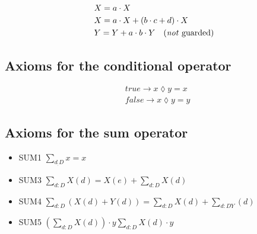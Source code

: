 \begin{align*}
  & X = a \cdot X \\
  & X = a \cdot X + (b \cdot c + d) \cdot X \\
  & Y = Y + a \cdot b \cdot Y \quad (\text{\emph{not} guarded})
\end{align*}

\subsection{Axioms for the conditional operator}

\begin{align*}
  & true \rightarrow x \lozenge y = x \\
  & false \rightarrow x \lozenge y = y
\end{align*}

\subsection{Axioms for the sum operator}

\begin{itemize}
  \item SUM1 $\sum_{d_:D} x = x$
  \item SUM3 $\sum_{d:D} X(d) = X(e) + \sum_{d:D} X(d)$
  \item SUM4 $\sum_{d:D} (X(d) + Y(d)) = \sum_{d:D} X(d) + \sum_{d:DY} (d)$
  \item SUM5 $(\sum_{d:D} X(d)) \cdot y \sum_{d:D} X(d) \cdot y$
\end{itemize}



















